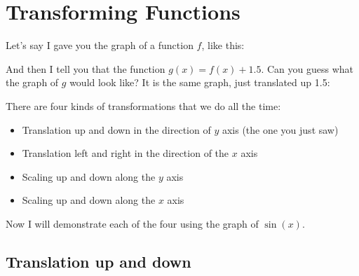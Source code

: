 \chapter{Transforming Functions}

Let's say I gave you the graph of a function $f$, like this:


And then I tell you that the function $g(x) = f(x) + 1.5$.  Can you guess what the graph of $g$ would look like? It is the same graph, just translated up 1.5:


There are four kinds of transformations that we do all the time:
\begin{itemize}
\item Translation up and down in the direction of $y$ axis (the one you just saw)
\item Translation left and right in the direction of the $x$ axis
\item Scaling up and down along the $y$ axis
\item Scaling up and down along the $x$ axis
\end{itemize}

Now I will demonstrate each of the four using the graph of $\sin(x)$.

\section{Translation up and down}

